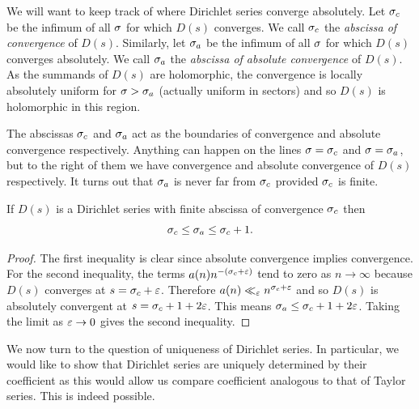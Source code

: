 \documentclass[12pt]{article}
\begin{document}
    We will want to keep track of where Dirichlet series converge absolutely. Let \(\sigma_{c}\) be the infimum of all \(\sigma\) for which \(D(s)\) converges. We call \(\sigma_{c}\) the \textit{abscissa of convergence} of \(D(s)\). Similarly, let \(\sigma_{a}\) be the infimum of all \(\sigma\) for which \(D(s)\) converges absolutely. We call \(\sigma_{a}\) the \textit{abscissa of absolute convergence} of \(D(s)\). As the summands of \(D(s)\) are holomorphic, the convergence is locally absolutely uniform for \(\sigma > \sigma_{a}\) (actually uniform in sectors) and so \(D(s)\) is holomorphic in this region.  
    
    The abscissas \(\sigma_{c}\) and \(\sigma_{a}\) act as the boundaries of convergence and absolute convergence respectively. Anything can happen on the lines \(\sigma = \sigma_{c}\) and \(\sigma = \sigma_{a}\), but to the right of them we have convergence and absolute convergence of \(D(s)\) respectively. It turns out that \(\sigma_{a}\) is never far from \(\sigma_{c}\) provided \(\sigma_{c}\) is finite.

    \begin{theorem}\label{thm:abscissa_of_absolute_convergence_bound}
      If \(D(s)\) is a Dirichlet series with finite abscissa of convergence \(\sigma_{c}\) then
      \[
        \sigma_{c} \le \sigma_{a} \le \sigma_{c}+1.
      \]
    \end{theorem}
    \begin{proof}
      The first inequality is clear since absolute convergence implies convergence. For the second inequality, the terms \(a(n)n^{-(\sigma_{c}+\varepsilon)}\) tend to zero as \(n \to \infty\) because \(D(s)\) converges at \(s = \sigma_{c}+\varepsilon\). Therefore \(a(n) \ll_{\varepsilon} n^{\sigma_{c}+\varepsilon}\) and so \(D(s)\) is absolutely convergent at \(s = \sigma_{c}+1+2\varepsilon\). This means \(\sigma_{a} \le \sigma_{c}+1+2\varepsilon\). Taking the limit as \(\varepsilon \to 0\) gives the second inequality.
    \end{proof}

    We now turn to the question of uniqueness of Dirichlet series. In particular, we would like to show that Dirichlet series are uniquely determined by their coefficient as this would allow us compare coefficient analogous to that of Taylor series. This is indeed possible.
\end{document}
